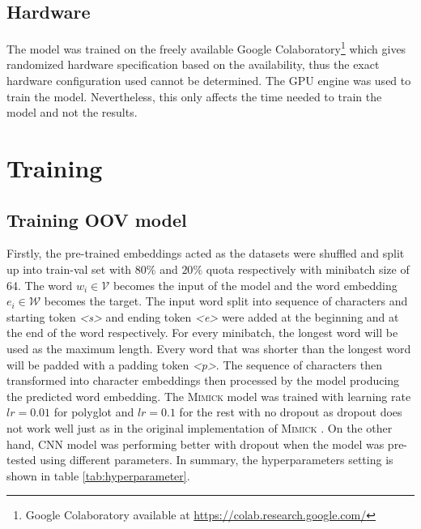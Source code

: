     \subsection{Hardware}
        The model was trained on the freely available Google
        Colaboratory\footnote{Google Colaboratory available at
        \url{https://colab.research.google.com/}} which gives
        randomized hardware specification based on the availability,
        thus the exact hardware configuration used cannot be
        determined. The GPU engine was used to train the model.
        Nevertheless, this only affects the time needed to train the
        model and not the results.

\section{Training}
    \subsection{Training OOV model}
        Firstly, the pre-trained embeddings acted as the datasets were
        shuffled and split up into train-val set with $80\%$ and
        $20\%$ quota respectively with minibatch size of 64. The word
        $w_i \in \mathcal{V}$ becomes the input of the model and the
        word embedding $e_i \in \mathcal{W}$ becomes the target. The
        input word split into sequence of characters and starting
        token \textit{\textless s\textgreater} and ending token
        \textit{\textless e\textgreater} were added at the beginning
        and at the end of the word respectively. For every minibatch,
        the longest word will be used as the maximum length. Every
        word that was shorter than the longest word will be padded
        with a padding token \textit{\textless p\textgreater}.
        The sequence of characters then transformed into character
        embeddings then processed by the model producing the predicted
        word embedding. The \textsc{Mimick} model was trained with
        learning rate $lr = 0.01$ for polyglot and $lr = 0.1$ for the
        rest with no dropout as dropout does not work well just as in
        the original implementation of \textsc{Mimick}
        \citep{mimicking2017Pinter}. On the other hand, CNN model was
        performing better with dropout when the model was pre-tested
        using different parameters. In summary, the hyperparameters
        setting is shown in table \ref{tab:hyperparameter}.

